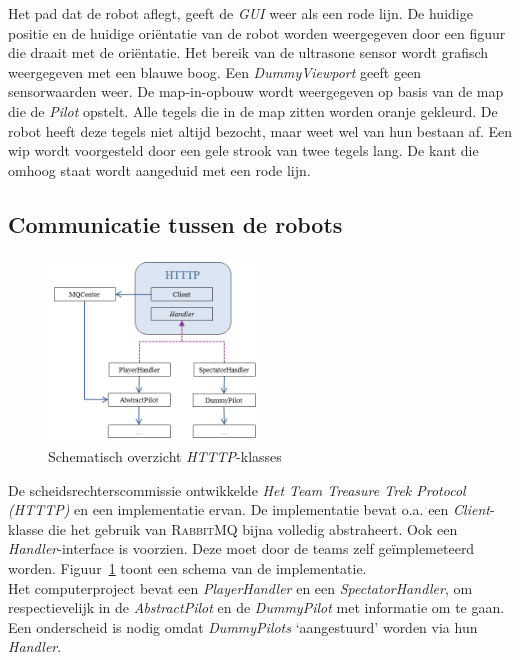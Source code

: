 \documentclass[eind]{penoverslag}
\begin{document}
Het pad dat de robot aflegt, geeft de \textit{GUI} weer als een rode lijn. De huidige positie en de huidige ori\"entatie van de robot worden weergegeven door een figuur die draait met de ori\"entatie. Het bereik van de ultrasone sensor wordt grafisch weergegeven met een blauwe boog. Een \textit{DummyViewport} geeft geen sensorwaarden weer. De map-in-opbouw wordt weergegeven op basis van de map die de \textit{Pilot} opstelt. Alle tegels die in de map zitten worden oranje gekleurd. De robot heeft deze tegels niet altijd bezocht, maar weet wel van hun bestaan af. Een wip wordt voorgesteld door een gele strook van twee tegels lang. De kant die omhoog staat wordt aangeduid met een rode lijn.

\subsection{Communicatie tussen de robots}
\label{ssec:RabbMQ}

\begin{figure}[h]
\centering
	\includegraphics[width=0.5\textwidth]{KlasHTTTP}
\caption{Schematisch overzicht \textit{HTTTP}-klasses}
\label{fig:klasHTTTP}
\end{figure}

De scheidsrechterscommissie ontwikkelde \textit{Het Team Treasure Trek Protocol (HTTTP)} en een implementatie ervan. De implementatie bevat o.a. een \textit{Client}-klasse die het gebruik van \textsc{RabbitMQ} bijna volledig abstraheert. Ook een \textit{Handler}-interface is voorzien. Deze moet door de teams zelf ge\"implemeteerd worden. Figuur~\ref{fig:klasHTTTP} toont een schema van de implementatie.\\

Het computerproject bevat een \textit{PlayerHandler} en een \textit{SpectatorHandler}, om respectievelijk in de \textit{AbstractPilot} en de \textit{DummyPilot} met informatie om te gaan. Een onderscheid is nodig omdat \textit{DummyPilots} `aangestuurd' worden via hun \textit{Handler}.\\
\end{document}
